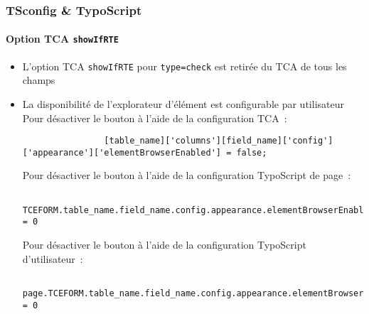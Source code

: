 \begin{frame}[fragile]
	\frametitle{TSconfig \& TypoScript}
	\framesubtitle{Option TCA \texttt{showIfRTE}}

	\lstset{basicstyle=\tiny\ttfamily}

	\begin{itemize}
		\item L'option TCA \texttt{showIfRTE} pour \texttt{type=check} est retirée du TCA de tous les champs
		\item La disponibilité de l'explorateur d'élément est configurable par utilisateur\newline
			\smaller
				Pour désactiver le bouton à l'aide de la configuration TCA~:
			\normalsize

			\begin{lstlisting}
				[table_name]['columns'][field_name]['config']['appearance']['elementBrowserEnabled'] = false;
			\end{lstlisting}

			\smaller
				Pour désactiver le bouton à l'aide de la configuration TypoScript de page~:
			\normalsize

			\begin{lstlisting}
				TCEFORM.table_name.field_name.config.appearance.elementBrowserEnabled = 0
			\end{lstlisting}

			\smaller
				Pour désactiver le bouton à l'aide de la configuration TypoScript d'utilisateur~:
			\normalsize

			\begin{lstlisting}
				page.TCEFORM.table_name.field_name.config.appearance.elementBrowserEnabled = 0
			\end{lstlisting}

	\end{itemize}

\end{frame}


